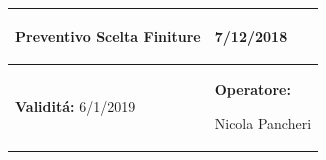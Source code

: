 \documentclass[a4paper]{article}
\begin{document}
                            \begin{center}
                            \begin{tabular}{|L{89mm} R{60mm}| }
                            \hline
                            \vspace{2.5mm}
                            \begin{spacing}{0}
                          \textbf{Preventivo Scelta Finiture}
                            \end{spacing}&
                            \vspace{2.5mm}
                            \begin{spacing}{0}
    
                          7/12/2018
    
                            \end{spacing}\\
                            \hline
                            \vspace{2.5mm}
                            \begin{spacing}{0}
                              \textbf{Validit\'a:}
                         6/1/2019
                            \end{spacing} &
                            \vspace{2.5mm}
                            \begin{spacing}{0}
                              \textbf{Operatore:}
    
                         Nicola Pancheri
                            \end{spacing} \\
                            \hline
                            \end{tabular}
                            \end{center}
                         
\end{document}
